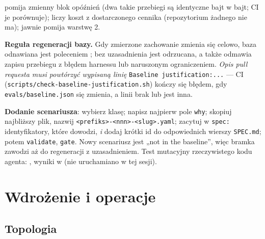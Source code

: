 { pomija zmienny blok opóźnień (dwa takie przebiegi są
identyczne bajt w bajt; CI je porównuje);  liczy koszt
z dostarczonego cennika (repozytorium żadnego nie ma); 
jawnie pomija warstwę 2.

\textbf{Reguła regeneracji bazy.} Gdy zmierzone zachowanie zmienia się celowo,
baza odnawiana jest poleceniem
; bez uzasadnienia jest
odrzucana, a także odmawia zapisu przebiegu z błędem harnessu lub naruszonym
ograniczeniem. \emph{Opis pull requesta musi powtórzyć wypisaną linię}
\texttt{Baseline justification:\allowbreak{}...} --- CI
(\texttt{scripts/\allowbreak{}check-\allowbreak{}baseline-\allowbreak{}justification.\allowbreak{}sh}) kończy się błędem, gdy
\texttt{evals/\allowbreak{}baseline.\allowbreak{}json} się zmienia, a linii brak lub jest inna.

\textbf{Dodanie scenariusza}: wybierz klasę; napisz najpierw pole \texttt{why};
skopiuj najbliższy plik, nazwij \texttt{<prefiks>-<nnn>-<slug>.yaml}; zacytuj
w \texttt{spec:} identyfikatory, które dowodzi, \emph{i} dodaj krótki id do
odpowiednich wierszy \texttt{SPEC.md}; potem \texttt{validate}, \texttt{gate}.
Nowy scenariusz jest „not in the baseline”, więc bramka zawodzi aż do
regeneracji z uzasadnieniem. Test mutacyjny rzeczywistego kodu agenta:
, wyniki w
 (nie uruchamiano w tej sesji).

\section{Wdrożenie i operacje}


\subsection{Topologia}

}
